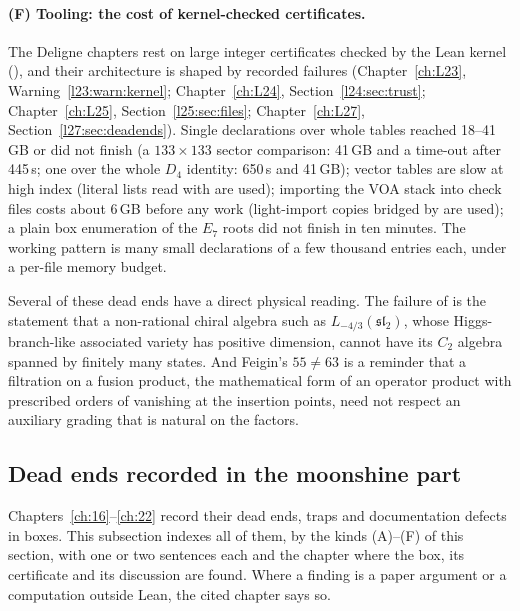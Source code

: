 \paragraph{(F) Tooling: the cost of kernel-checked certificates.} The Deligne chapters rest on large integer certificates
checked by the Lean kernel (), and their architecture is shaped by recorded failures (Chapter~\ref{ch:L23},
Warning~\ref{l23:warn:kernel}; Chapter~\ref{ch:L24}, Section~\ref{l24:sec:trust}; Chapter~\ref{ch:L25},
Section~\ref{l25:sec:files}; Chapter~\ref{ch:L27}, Section~\ref{l27:sec:deadends}). Single declarations over whole tables
reached 18--41\,GB or did not finish (a $133\times133$ sector comparison: 41\,GB and a time-out after 445\,s; one
 over the whole $D_4$ identity: 650\,s and 41\,GB); \lean{![…]} vector tables are slow at high index
(literal lists read with  are used); importing the VOA stack into check files costs about 6\,GB before any work
(light-import copies bridged by  are used); a plain box enumeration of the $E_7$ roots did not finish in ten
minutes. The working pattern is many small declarations of a few thousand entries each, under a per-file memory budget.

\begin{physics}
Several of these dead ends have a direct physical reading. The failure of  is the statement that a
non-rational chiral algebra such as $L_{-4/3}(\mathfrak{sl}_2)$, whose Higgs-branch-like associated variety has positive
dimension, cannot have its $C_2$ algebra spanned by finitely many states. And Feigin's $55\neq63$ is
a reminder that a filtration on a fusion product, the mathematical form of an operator product with prescribed orders
of vanishing at the insertion points, need not respect an auxiliary grading that is natural on the factors.
\end{physics}

\subsection{Dead ends recorded in the moonshine part}\label{ch15:sec:deadends-moon}

Chapters~\ref{ch:16}--\ref{ch:22} record their dead ends, traps and documentation defects in  boxes. This
subsection indexes all of them, by the kinds (A)--(F) of this section, with one or two sentences each and the chapter
where the box, its certificate and its discussion are found. Where a finding is a paper argument or a computation outside
Lean, the cited chapter says so.

